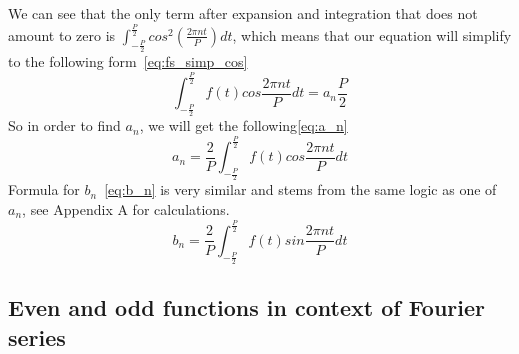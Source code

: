 \documentclass[titlepage]{article}
\begin{document}
    We can see that the only term after expansion and integration that does not 
    amount to zero is $\int_{-\frac{P}{2}}^{\frac{P}{2}}cos^2(\frac{2\pi nt}{P})dt$,
    which means that our equation will simplify to the following form~\eqref{eq:fs_simp_cos}
    \begin{equation}\label{eq:fs_simp_cos}
        \int_{-\frac{P}{2}}^{\frac{P}{2}}f(t)cos\frac{2\pi nt}{P}dt = a_n\frac{P}{2}
    \end{equation}
    So in order to find $a_n$, we will get the following\eqref{eq:a_n}
    \begin{equation}\label{eq:a_n}
        a_n = \frac{2}{P}\int_{-\frac{P}{2}}^{\frac{P}{2}}f(t)cos\frac{2\pi nt}{P}dt
    \end{equation}
    Formula for $b_n$~\eqref{eq:b_n} is very similar and stems from the same logic as one of 
    $a_n$, see Appendix A for calculations.
    \begin{equation}\label{eq:b_n}
        b_n = \frac{2}{P}\int_{-\frac{P}{2}}^{\frac{P}{2}}f(t)sin\frac{2\pi nt}{P}dt
    \end{equation}

\subsection{Even and odd functions in context of Fourier series}
\end{document}
